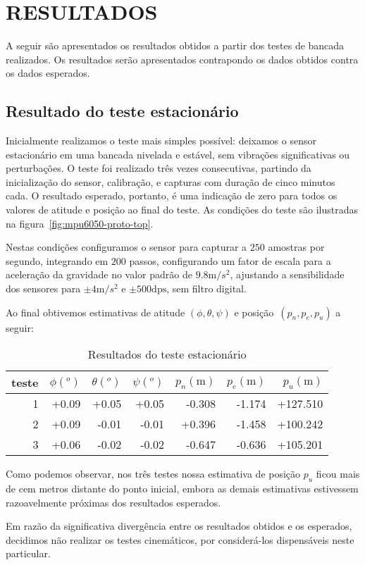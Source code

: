 \chapter{RESULTADOS}\label{chap:resuldatos}

A seguir são apresentados os resultados obtidos a partir dos testes de bancada realizados. Os resultados serão apresentados contrapondo os dados obtidos contra os dados esperados.

\section{Resultado do teste estacionário}

Inicialmente realizamos o teste mais simples possível: deixamos o sensor estacionário em uma bancada nivelada e estável, sem vibrações significativas ou perturbações. O teste foi realizado três vezes consecutivas, partindo da inicialização do sensor, calibração, e capturas com duração de cinco minutos cada. O resultado esperado, portanto, é uma indicação de zero para todos os valores de atitude e posição ao final do teste. As condições do teste são ilustradas na figura~\ref{fig:mpu6050-proto-top}.

Nestas condições configuramos o sensor para capturar a \(250\) amostras por segundo, integrando em \(200\) passos, configurando um fator de escala para a aceleração da gravidade no valor padrão de \(9.8\textrm{m}/{s}^{2}\), ajustando a sensibilidade dos sensores para \(\pm 4\textrm{m}/{s}^{2}\) e \(\pm 500\textrm{dps}\), sem filtro digital.

Ao final obtivemos estimativas de atitude \((\phi,\theta,\psi)\) e posição~\((p_{n},p_{e},p_{u})\) a seguir:

\begin{table}[ht]
    \caption{Resultados do teste estacionário}
    \centering
    \begin{tabular}{r r r r r r r}
        teste & \(\phi (^{o})\) & \(\theta(^{o})\) & \(\psi(^{o})\) & \(p_{n}(\textrm{m})\) & \(p_{e}(\textrm{m})\) & \(p_{u}(\textrm{m})\)  \\
        \toprule
        1 & +0.09 & +0.05 & +0.05 & -0.308 & -1.174 & +127.510  \\
        2 & +0.09 & -0.01 & -0.01 & +0.396 & -1.458 & +100.242  \\
        3 & +0.06 & -0.02 & -0.02 & -0.647 & -0.636 & +105.201  \\
        \bottomrule
    \end{tabular}
    \label{Tab:tabela1}
\end{table}

Como podemos observar, nos três testes nossa estimativa de posição \(p_{u}\) ficou mais de cem metros distante do ponto inicial, embora as demais estimativas estivessem razoavelmente próximas dos resultados esperados.

Em razão da significativa divergência entre os resultados obtidos e os esperados, decidimos não realizar os testes cinemáticos, por considerá-los dispensáveis neste particular.
